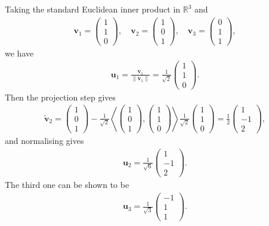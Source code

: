 \documentclass[letter-paper]{tufte-book}
\newenvironment{example}[1][Example]{\begin{trivlist}
\item[\hskip \labelsep {\bfseries #1}]}{\end{trivlist}}
\newcommand{\inner}[2]{\left\langle #1, #2\right\rangle}
\newcommand{\ub}{{\boldsymbol{u}}}
\newcommand{\vb}{{\boldsymbol{v}}}
\begin{document}
\begin{example}
  Taking the standard Euclidean inner product in $\mathbb{R}^3$ and
  \begin{align*}
    \vb_1 = \begin{pmatrix}1 \\ 1 \\ 0 \end{pmatrix}, \quad
    \vb_2 = \begin{pmatrix}1 \\ 0 \\ 1 \end{pmatrix}, \quad
    \vb_3 = \begin{pmatrix}0 \\ 1 \\ 1 \end{pmatrix},
  \end{align*}
  we have
  \begin{align*}
    \ub_1 = \frac{\vb_1}{\|\vb_1\|} = \frac{1}{\sqrt{2}} \begin{pmatrix}1 \\ 1 \\ 0 \end{pmatrix}.
  \end{align*}
  Then the projection step gives
  \begin{align*}
    \tilde{\vb}_2 = \begin{pmatrix}1 \\ 0 \\ 1 \end{pmatrix} - \frac{1}{\sqrt{2}}\inner{\begin{pmatrix}1 \\ 0 \\ 1 \end{pmatrix}}{\begin{pmatrix}1 \\ 1 \\ 0 \end{pmatrix}}\frac{1}{\sqrt{2}} \begin{pmatrix}1 \\ 1 \\ 0 \end{pmatrix} = \frac{1}{2}\begin{pmatrix}1 \\ -1 \\ 2 \end{pmatrix},
  \end{align*}
  and normalising gives
  \begin{align*}
    \ub_2 = \frac{1}{\sqrt{6}}\begin{pmatrix}1 \\ -1 \\ 2 \end{pmatrix}.
  \end{align*}
  The third one can be shown to be
  \begin{align*}
    \ub_3 = \frac{1}{\sqrt{3}}\begin{pmatrix}-1 \\ 1 \\ 1 \end{pmatrix}.
  \end{align*}
\end{example}
\end{document}
